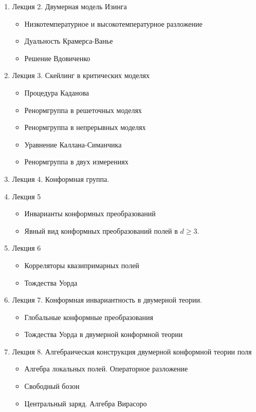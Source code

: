 \documentclass[a4paper,12pt]{article}
\theoremstyle{definition}
\theoremstyle{definition}
\theoremstyle{definition}
\begin{document}
\begin{enumerate}
\item Лекция 2. Двумерная модель Изинга
  \begin{itemize}
  \item Низкотемпературное и высокотемпературное разложение
  \item Дуальность Крамерса-Ванье
  \item Решение Вдовиченко
  \end{itemize}
\item Лекция 3. Скейлинг в критических моделях
  \begin{itemize}
  \item Процедура Каданова
  \item Ренормгруппа в решеточных моделях
  \item Ренормгруппа в непрерывных моделях
  \item Уравнение Каллана-Симанчика
  \item Ренормгруппа в двух измерениях
  \end{itemize}
\item Лекция 4. Конформная группа.
\item Лекция 5
  \begin{itemize}
  \item Инварианты конформных преобразований
  \item Явный вид конформных преобразований полей в $d\geq 3$.
  \end{itemize}
\item Лекция 6
  \begin{itemize}
  \item Корреляторы квазипримарных полей
  \item Тождества Уорда
  \end{itemize}
\item Лекция 7. Конформная инвариантность в двумерной теории.
  \begin{itemize}
  \item Глобальные конформные преобразования
  \item Тождества Уорда в двумерной конформной теории
  \end{itemize}
\item Лекция 8. Алгебраическая конструкция двумерной конформной теории поля
  \begin{itemize}
  \item Алгебра локальных полей. Операторное разложение
  \item Свободный бозон
  \item Центральный заряд. Алгебра Вирасоро
  \end{itemize}

\end{enumerate}
\end{document}
